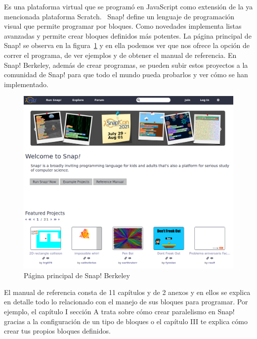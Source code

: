 \documentclass[a4paper, 12pt]{book}
\begin{document}
Es una plataforma virtual que se programó en JavaScript como extensión de la ya mencionada plataforma Scratch. ~Snap! define un lenguaje de programación visual que permite programar por bloques. Como novedades implementa listas avanzadas y permite crear bloques definidos  más potentes. La página principal de Snap! se observa en la figura~\ref{figura:ppal_snap} y en ella podemos ver que nos ofrece la opción de correr el programa, de ver ejemplos y de obtener el manual de referencia. En Snap! Berkeley, además de crear programas, se pueden subir estos proyectos a la comunidad de Snap! para que todo el mundo pueda probarlos y ver cómo se han implementado.
\begin{figure}[h]
        \centering
        \includegraphics[scale=0.4]{img/snap_ppal.png}
        \caption{Página principal de Snap! Berkeley}
        \label{figura:ppal_snap}
\end{figure}


El manual de referencia consta de 11 capítulos y de 2 anexos y en ellos se explica en detalle todo lo relacionado con el manejo de sus bloques para programar. Por ejemplo, el capítulo I sección A trata sobre cómo crear paralelismo en Snap! gracias a la configuración de un tipo de bloques o el capítulo III te explica cómo crear tus propios bloques definidos.
\end{document}
